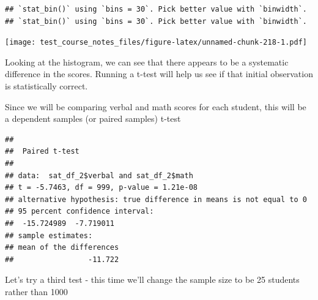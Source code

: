 \documentclass[
]{book}
\newenvironment{Shaded}{\begin{snugshade}}{\end{snugshade}}
\newcommand{\AttributeTok}[1]{\textcolor[rgb]{0.77,0.63,0.00}{#1}}
\newcommand{\CommentTok}[1]{\textcolor[rgb]{0.56,0.35,0.01}{\textit{#1}}}
\newcommand{\ConstantTok}[1]{\textcolor[rgb]{0.00,0.00,0.00}{#1}}
\newcommand{\FunctionTok}[1]{\textcolor[rgb]{0.00,0.00,0.00}{#1}}
\newcommand{\NormalTok}[1]{#1}
\newcommand{\OtherTok}[1]{\textcolor[rgb]{0.56,0.35,0.01}{#1}}
\newcommand{\SpecialCharTok}[1]{\textcolor[rgb]{0.00,0.00,0.00}{#1}}
\begin{document}
\begin{verbatim}
## `stat_bin()` using `bins = 30`. Pick better value with `binwidth`.
## `stat_bin()` using `bins = 30`. Pick better value with `binwidth`.
\end{verbatim}

\texttt{[image: test\_course\_notes\_files/figure-latex/unnamed-chunk-218-1.pdf]}

Looking at the histogram, we can see that there appears to be a systematic difference in the scores. Running a t-test will help us see if that initial observation is statistically correct.

Since we will be comparing verbal and math scores for each student, this will be a dependent samples (or paired samples) t-test

\begin{Shaded}
\end{Shaded}

\begin{verbatim}
## 
##  Paired t-test
## 
## data:  sat_df_2$verbal and sat_df_2$math
## t = -5.7463, df = 999, p-value = 1.21e-08
## alternative hypothesis: true difference in means is not equal to 0
## 95 percent confidence interval:
##  -15.724989  -7.719011
## sample estimates:
## mean of the differences 
##                 -11.722
\end{verbatim}

Let's try a third test - this time we'll change the sample size to be 25 students rather than 1000
\end{document}
